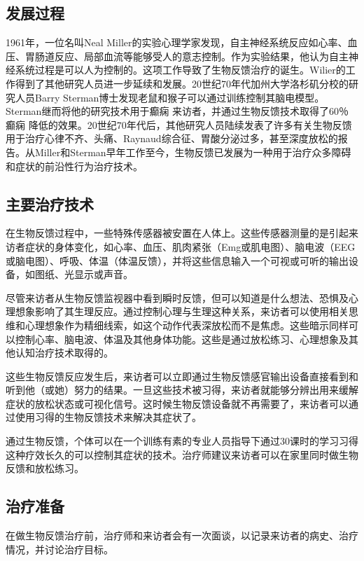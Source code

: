 \subsection{发展过程}

1961年，一位名叫Neal
Miller的实验心理学家发现，自主神经系统反应如心率、血压、胃肠道反应、局部血流等能够受人的意志控制。作为实验结果，他认为自主神经系统过程是可以人为控制的。这项工作导致了生物反馈治疗的诞生。Wilier的工作得到了其他研究人员进一步延续和发展。20世纪70年代加州大学洛杉矶分校的研究人员Barry
Sterman博士发现老鼠和猴子可以通过训练控制其脑电模型。Sterman继而将他的研究技术用于癫痫
来访者，并通过生物反馈技术取得了60％癫痫
降低的效果。20世纪70年代后，其他研究人员陆续发表了许多有关生物反馈用于治疗心律不齐、头痛、Raynaud综合征、胃酸分泌过多，甚至深度放松的报告。从Miller和Sterman早年工作至今，生物反馈已发展为一种用于治疗众多障碍和症状的前沿性行为治疗技术。

\subsection{主要治疗技术}

在生物反馈过程中，一些特殊传感器被安置在人体上。这些传感器测量的是引起来访者症状的身体变化，如心率、血压、肌肉紧张（Emg或肌电图）、脑电波（EEG或脑电图）、呼吸、体温（体温反馈），并将这些信息输入一个可视或可听的输出设备，如图纸、光显示或声音。

尽管来访者从生物反馈监视器中看到瞬时反馈，但可以知道是什么想法、恐惧及心理想象影响了其生理反应。通过控制心理与生理这种关系，来访者可以使用相关思维和心理想象作为精细线索，如这个动作代表深放松而不是焦虑。这些暗示同样可以控制心率、脑电波、体温及其他身体功能。这些是通过放松练习、心理想象及其他认知治疗技术取得的。

这些生物反馈反应发生后，来访者可以立即通过生物反馈感官输出设备直接看到和听到他（或她）努力的结果。一旦这些技术被习得，来访者就能够分辨出用来缓解症状的放松状态或可视化信号。这时候生物反馈设备就不再需要了，来访者可以通过使用习得的生物反馈技术来解决其症状了。

通过生物反馈，个体可以在一个训练有素的专业人员指导下通过30课时的学习习得这种疗效长久的可以控制其症状的技术。治疗师建议来访者可以在家里同时做生物反馈和放松练习。

\subsection{治疗准备}

在做生物反馈治疗前，治疗师和来访者会有一次面谈，以记录来访者的病史、治疗情况，并讨论治疗目标。

